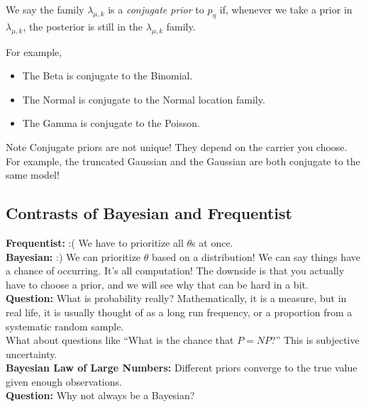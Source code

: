 \begin{definition}
    We say the family $\lambda_{\mu, k}$ is a \emph{conjugate prior} to $p_{\eta}$ if, whenever we take a prior in $\lambda_{\mu, k}$, the posterior is still in the $\lambda_{\mu, k}$ family.
\end{definition}

For example,
\begin{itemize}
    \item The Beta is conjugate to the Binomial.
    \item The Normal is conjugate to the Normal location family.
    \item The Gamma is conjugate to the Poisson.
\end{itemize}

\begin{remark}{Note}
    Conjugate priors are not unique! They depend on the carrier you choose. For example, the truncated Gaussian and the Gaussian are both conjugate to the same model!
\end{remark}

\subsection*{Contrasts of Bayesian and Frequentist}
\sectionspace

\textbf{Frequentist:} :( We have to prioritize all $\theta$s at once.\\

\textbf{Bayesian:} :) We can prioritize $\theta$ based on a distribution! We can say things have a chance of occurring. It's all computation! The downside is that you actually have to choose a prior, and we will see why that can be hard in a bit.\\

\textbf{Question:} What is probability really? Mathematically, it is a measure, but in real life, it is usually thought of as a long run frequency, or a proportion from a systematic random sample.\\

What about questions like ``What is the chance that $P = NP$?'' This is subjective uncertainty.\\

\textbf{Bayesian Law of Large Numbers:} Different priors converge to the true value given enough observations.\\

\textbf{Question:} Why not always be a Bayesian?

